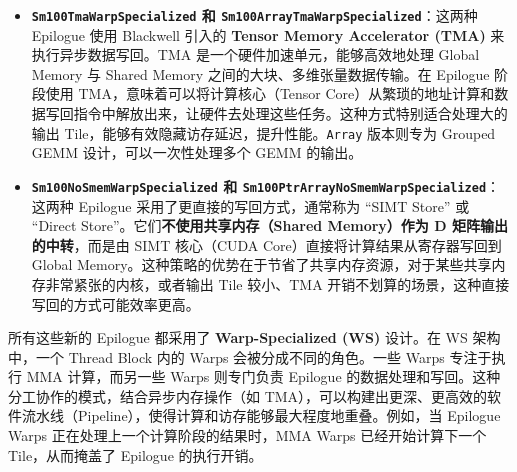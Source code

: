 \begin{itemize}
\item \textbf{\texttt{Sm100\allowbreak{}Tma\allowbreak{}Warp\allowbreak{}Specialized} 和 \texttt{S\allowbreak{}m\allowbreak{}1\allowbreak{}0\allowbreak{}0\allowbreak{}A\allowbreak{}r\allowbreak{}r\allowbreak{}a\allowbreak{}y\allowbreak{}T\allowbreak{}m\allowbreak{}a\allowbreak{}W\allowbreak{}a\allowbreak{}r\allowbreak{}p\allowbreak{}S\allowbreak{}p\allowbreak{}e\allowbreak{}c\allowbreak{}i\allowbreak{}a\allowbreak{}l\allowbreak{}i\allowbreak{}z\allowbreak{}e\allowbreak{}d}}：这两种 Epilogue 使用 Blackwell 引入的 \textbf{Tensor Memory Accelerator (TMA)} 来执行异步数据写回。TMA 是一个硬件加速单元，能够高效地处理 Global Memory 与 Shared Memory 之间的大块、多维张量数据传输。在 Epilogue 阶段使用 TMA，意味着可以将计算核心（Tensor Core）从繁琐的地址计算和数据写回指令中解放出来，让硬件去处理这些任务。这种方式特别适合处理大的输出 Tile，能够有效隐藏访存延迟，提升性能。\texttt{Array} 版本则专为 Grouped GEMM 设计，可以一次性处理多个 GEMM 的输出。
\item \textbf{\texttt{S\allowbreak{}m\allowbreak{}1\allowbreak{}0\allowbreak{}0\allowbreak{}N\allowbreak{}o\allowbreak{}S\allowbreak{}m\allowbreak{}e\allowbreak{}m\allowbreak{}W\allowbreak{}a\allowbreak{}r\allowbreak{}p\allowbreak{}S\allowbreak{}p\allowbreak{}e\allowbreak{}c\allowbreak{}i\allowbreak{}a\allowbreak{}l\allowbreak{}i\allowbreak{}z\allowbreak{}e\allowbreak{}d} 和 \texttt{S\allowbreak{}m\allowbreak{}1\allowbreak{}0\allowbreak{}0\allowbreak{}P\allowbreak{}t\allowbreak{}r\allowbreak{}A\allowbreak{}r\allowbreak{}r\allowbreak{}a\allowbreak{}y\allowbreak{}N\allowbreak{}o\allowbreak{}S\allowbreak{}m\allowbreak{}e\allowbreak{}m\allowbreak{}W\allowbreak{}a\allowbreak{}r\allowbreak{}p\allowbreak{}S\allowbreak{}p\allowbreak{}e\allowbreak{}c\allowbreak{}i\allowbreak{}a\allowbreak{}l\allowbreak{}i\allowbreak{}z\allowbreak{}e\allowbreak{}d}}：这两种 Epilogue 采用了更直接的写回方式，通常称为 “SIMT Store” 或 “Direct Store”。它们\textbf{不使用共享内存（Shared Memory）作为 D 矩阵输出的中转}，而是由 SIMT 核心（CUDA Core）直接将计算结果从寄存器写回到 Global Memory。这种策略的优势在于节省了共享内存资源，对于某些共享内存非常紧张的内核，或者输出 Tile 较小、TMA 开销不划算的场景，这种直接写回的方式可能效率更高。
\end{itemize}

所有这些新的 Epilogue 都采用了 \textbf{Warp-Specialized (WS)} 设计。在 WS 架构中，一个 Thread Block 内的 Warps 会被分成不同的角色。一些 Warps 专注于执行 MMA 计算，而另一些 Warps 则专门负责 Epilogue 的数据处理和写回。这种分工协作的模式，结合异步内存操作（如 TMA），可以构建出更深、更高效的软件流水线（Pipeline），使得计算和访存能够最大程度地重叠。例如，当 Epilogue Warps 正在处理上一个计算阶段的结果时，MMA Warps 已经开始计算下一个 Tile，从而掩盖了 Epilogue 的执行开销。

